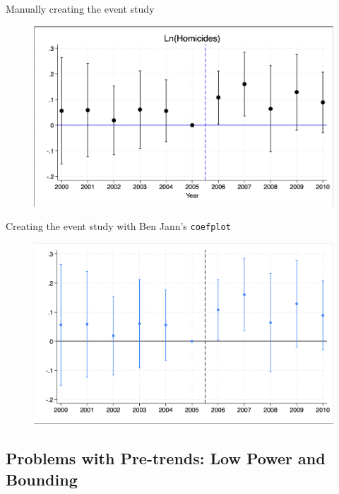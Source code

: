 \documentclass{beamer}
\begin{document}
\begin{frame}{Manually creating the event study}

	\begin{figure}
	\includegraphics[scale=0.20]{./lecture_includes/simple_eventstudy_manual}
	\end{figure}

\end{frame}




\begin{frame}{Creating the event study with Ben Jann's \texttt{coefplot}}

	\begin{figure}
	\includegraphics[scale=0.20]{./lecture_includes/simple_eventstudy.png}
	\end{figure}

\end{frame}






\subsection{Problems with Pre-trends: Low Power and Bounding}
\end{document}
